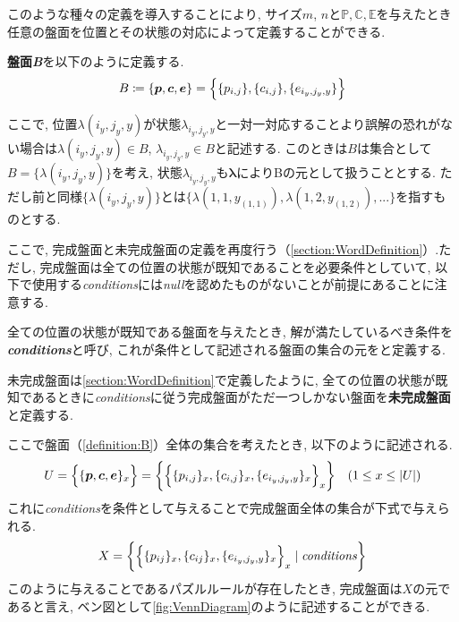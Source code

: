 このような種々の定義を導入することにより, サイズ$m$, $n$と$\mathbb{P},\mathbb{C},\mathbb{E}$を与えたとき任意の盤面を位置とその状態の対応によって定義することができる.
\begin{definition}[盤面\textit{B}]\label{definition:B}
  \textbf{盤面\textit{B}}を以下のように定義する.
  \begin{equation*}
    B\coloneqq \{\bm{p},\bm{c},\bm{e}\}=\Bigl\{\{p_{i,j}\},\{c_{i,j}\},\{e_{i_y,j_y,y}\}\Bigr\}
  \end{equation*}
\end{definition}
ここで, 位置$\lambda(i_y,j_y,y)$が状態$\lambda_{i_y,j_y,y}$と一対一対応することより誤解の恐れがない場合は$\lambda(i_y,j_y,y) \in B  $, $\lambda_{i_y,j_y,y}\in B $と記述する.
このときは$B$は集合として$B=\{\lambda(i_y,j_y,y)\}$を考え, 状態$\lambda_{i_y,j_y,y}$も$\bm{\lambda}$によりBの元として扱うこととする.
ただし前と同様$\{\lambda(i_y,j_y,y)\}$とは$\{\lambda(1,1,y_{(1,1)}), \lambda(1,2,y_{(1,2)}),...\}$を指すものとする.



ここで, 完成盤面と未完成盤面の定義を再度行う（\cref{section:WordDefinition}）.ただし, 完成盤面は全ての位置の状態が既知であることを必要条件としていて, 以下で使用する\textit{conditions}には\textit{null}を認めたものがないことが前提にあることに注意する.
\begin{definition}\label{definition:Conditions}
  全ての位置の状態が既知である盤面を与えたとき, 解が満たしているべき条件を\textbf{\textit{conditions}}と呼び, これが条件として記述される盤面の集合の元をと定義する.
\end{definition}

未完成盤面は\cref{section:WordDefinition}で定義したように, 全ての位置の状態が既知であるときに\textit{conditions}に従う完成盤面がただ一つしかない盤面を\textbf{未完成盤面}と定義する.

ここで盤面（\cref{definition:B}）全体の集合を考えたとき, 以下のように記述される.
\begin{equation}\label{equation:U}
  U=\Bigl\{\{\bm{p},\bm{c},\bm{e}\}_x\Bigr\}=\biggl\{\Bigl\{\{p_{i,j}\}_x,\{c_{i,j}\}_x,\{e_{i_y,j_y,y}\}_x\Bigr\}_x\biggr\} \quad (1\leq x \leq |U|)
\end{equation}
これに\textit{conditions}を条件として与えることで完成盤面全体の集合が下式で与えられる.
\begin{equation}\label{equation:X}
  X=\biggl\{\Bigl\{\{p_{ij}\}_x,\{c_{ij}\}_x,\{e_{i_y,j_y,y}\}_x\Bigr\}_x\mid \rm{\textit{conditions}}\biggr\}
\end{equation}
このように与えることであるパズルルールが存在したとき, 完成盤面は$X$の元であると言え, ベン図として\cref{fig:VennDiagram}のように記述することができる.

